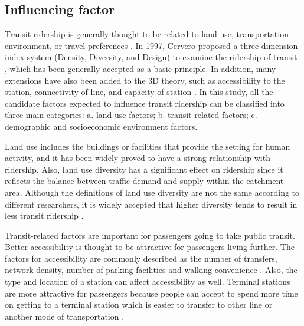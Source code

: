 \subsection{Influencing factor}
Transit ridership is generally thought to be related to land use, transportation environment, or travel preferences \cite{thompson1997achieving}. In 1997, Cervero proposed a three dimension index system (Density, Diversity, and Design) to examine the ridership of transit \cite{cervero1997travel}, which has been generally accepted as a basic principle. In addition, many extensions have also been added to the 3D theory, such as accessibility to the station, connectivity of line, and capacity of station \cite{beimborn2003accessibility,garcia2013walking}. In this study, all the candidate factors expected to influence transit ridership can be classified into three main categories: a. land use factors; b. transit-related factors; c. demographic and socioeconomic environment factors.

Land use includes the buildings or facilities that provide the setting for human activity, and it has been widely proved to have a strong relationship with ridership. Also, land use diversity has a significant effect on ridership since it reflects the balance between traffic demand and supply within the catchment area. Although the definitions of land use diversity are not the same according to different researchers, it is widely accepted that higher diversity tends to result in less transit ridership \cite{cardozo2012application,choi2012analysis,gutierrez2011transit,jun2015land,sohn2010factors,sung2014exploring}.

Transit-related factors are important for passengers going to take public transit. Better accessibility is thought to be attractive for passengers living further. The factors for accessibility are commonly described as the number of transfers, network density, number of parking facilities and walking convenience \cite{kuby2004factors,sohn2010factors,taylor2009nature,zhao2014analysis,chu2004ridership}. Also, the type and location of a station can affect accessibility as well. Terminal stations are more attractive for passengers because people can accept to spend more time on getting to a terminal station which is easier to transfer to other line or another mode of transportation \cite{o1996walking}.

